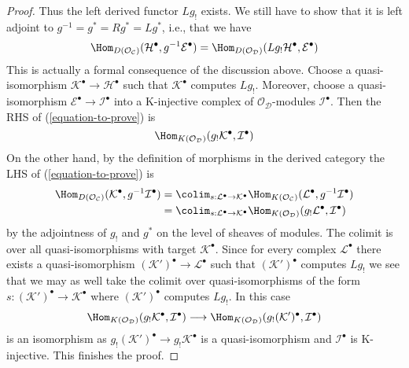 \begin{proof}
\medskip\noindent
Thus the left derived functor $Lg_!$ exists. We still have to show that
it is left adjoint to $g^{-1} = g^* = Rg^* = Lg^*$, i.e., that we have
\begin{equation}
\label{equation-to-prove}
\Hom_{D(\mathcal{O}_\mathcal{C})}(
\mathcal{H}^\bullet, g^{-1}\mathcal{E}^\bullet)
=
\Hom_{D(\mathcal{O}_\mathcal{D})}(
Lg_!\mathcal{H}^\bullet, \mathcal{E}^\bullet)
\end{equation}
This is actually a formal consequence of the discussion above.
Choose a quasi-isomorphism
$\mathcal{K}^\bullet \to \mathcal{H}^\bullet$
such that $\mathcal{K}^\bullet$ computes $Lg_!$.
Moreover, choose a quasi-isomorphism
$\mathcal{E}^\bullet \to \mathcal{I}^\bullet$ into a K-injective
complex of $\mathcal{O}_\mathcal{D}$-modules $\mathcal{I}^\bullet$.
Then the RHS of (\ref{equation-to-prove}) is
$$
\Hom_{K(\mathcal{O}_\mathcal{D})}(
g_!\mathcal{K}^\bullet, \mathcal{I}^\bullet)
$$
On the other hand, by the definition of morphisms in
the derived category the LHS of (\ref{equation-to-prove}) is
\begin{align*}
\Hom_{D(\mathcal{O}_\mathcal{C})}(
\mathcal{K}^\bullet, g^{-1}\mathcal{I}^\bullet)
& =
\colim_{s : \mathcal{L}^\bullet \to \mathcal{K}^\bullet}
\Hom_{K(\mathcal{O}_\mathcal{C})}(
\mathcal{L}^\bullet, g^{-1}\mathcal{I}^\bullet) \\
& =
\colim_{s : \mathcal{L}^\bullet \to \mathcal{K}^\bullet}
\Hom_{K(\mathcal{O}_\mathcal{D})}(
g_!\mathcal{L}^\bullet, \mathcal{I}^\bullet)
\end{align*}
by the adjointness of $g_!$ and $g^*$ on the level of sheaves of modules.
The colimit is over all quasi-isomorphisms with target
$\mathcal{K}^\bullet$. Since for every complex $\mathcal{L}^\bullet$
there exists a quasi-isomorphism
$(\mathcal{K}')^\bullet \to \mathcal{L}^\bullet$ such that
$(\mathcal{K}')^\bullet$ computes $Lg_!$ we see that we may as well
take the colimit over quasi-isomorphisms of the form
$s : (\mathcal{K}')^\bullet \to \mathcal{K}^\bullet$ where
$(\mathcal{K}')^\bullet$ computes $Lg_!$. In this case
$$
\Hom_{K(\mathcal{O}_\mathcal{D})}(
g_!\mathcal{K}^\bullet, \mathcal{I}^\bullet)
\longrightarrow
\Hom_{K(\mathcal{O}_\mathcal{D})}(
g_!(\mathcal{K}')^\bullet, \mathcal{I}^\bullet)
$$
is an isomorphism as $g_!(\mathcal{K}')^\bullet \to g_!\mathcal{K}^\bullet$
is a quasi-isomorphism and $\mathcal{I}^\bullet$ is K-injective. This finishes
the proof.
\end{proof}

